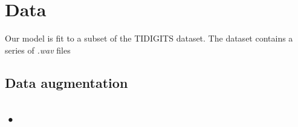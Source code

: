 \documentclass{article} %
\begin{document}
\section{Data}
Our model is fit to a subset of the TIDIGITS dataset. The dataset contains a series of \textit{.wav} files

\subsection{Data augmentation}

\subsection{•}
\end{document}
